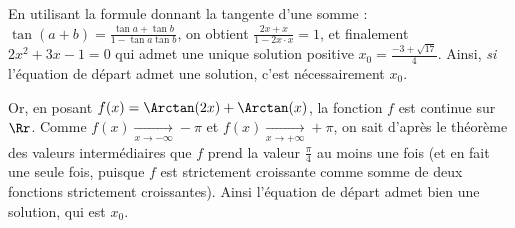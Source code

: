 {\begin{enumerate}
{En utilisant la formule donnant la tangente d'une somme :
$\tan(a+b)=\frac{\tan a +\tan b}{1-\tan a \tan b}$, on obtient $\frac{2x+x}{1-2x\cdot x}=1$, 
et finalement $2x^2+3x-1=0$ qui admet une unique solution positive $x_0=\frac{-3+\sqrt{17}}{4}$. 
Ainsi, {\it si} l'équation de départ admet une solution, c'est nécessairement $x_0$. 

Or, en posant $f(x)=\Arctan(2x)+\Arctan(x)$, la fonction $f$ est continue sur $\Rr$. 
Comme $f(x)\xrightarrow[x\to -\infty]{}-\pi$ et $f(x)\xrightarrow[x\to +\infty]{}+\pi$, 
on sait d'après le théorème des valeurs intermédiaires que $f$ prend la valeur 
$\frac{\pi}{4}$ au moins une fois (et en fait une seule fois, puisque $f$ est 
strictement croissante comme somme de deux fonctions strictement croissantes). 
Ainsi l'équation de départ admet bien une solution, qui est $x_0$.}
\end{enumerate}
}
